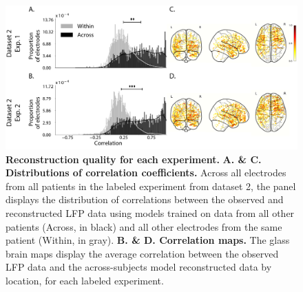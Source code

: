 \documentclass{article}
\begin{document}
\begin{figure}[ptb]
\centering
\includegraphics[width=\textwidth]{figs/supplemental_3}
\caption{\small \textbf{Reconstruction quality for each experiment.} \textbf{A. \& C.  Distributions
      of correlation coefficients.}  Across all electrodes from all
    patients in the labeled experiment from dataset 2, the panel displays the distribution of correlations between the observed and reconstructed LFP data using models trained on data from all other patients (Across, in black) and all other electrodes from the same patient (Within, in gray). 
    \textbf{B. \& D. Correlation maps.}  The glass brain maps display the
    average correlation between the observed LFP data and the across-subjects model reconstructed data by location, for each labeled experiment.}
\label{fig:supplemental_3}
\end{figure}


% 
\end{document}
